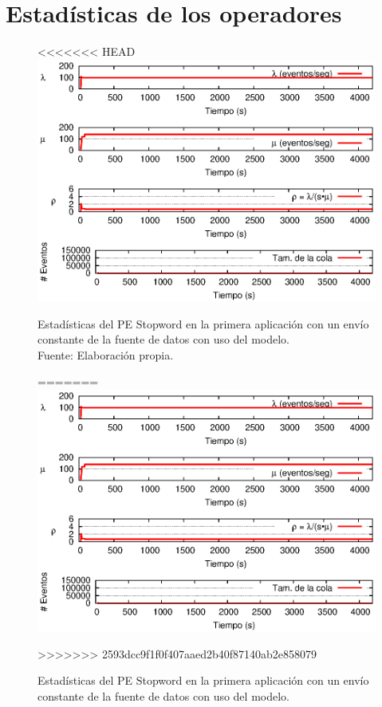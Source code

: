 \chapter{Estad\'isticas de los operadores}
\label{apendice:estadisticas-operadores}
\begin{figure}[!ht]
<<<<<<< HEAD
    \centering
    \captionsetup{justification=centering}
    \includegraphics[scale=0.9]{images/exp/app1/uniform/cm/statusStopwordPE.eps}
    \caption[Estadísticas del PE Stopword en la primera aplicación con un envío constante de la fuente de datos con uso del modelo.]{Estadísticas del PE Stopword en la primera aplicación con un envío constante de la fuente de datos con uso del modelo.\\Fuente: Elaboración propia.}
=======
\centering
    \includegraphics[scale=1]{images/exp/app1/uniform/cm/statusStopwordPE.eps}
    \caption{Estad\'isticas del PE Stopword en la primera aplicaci\'on con un env\'io constante de la fuente de datos con uso del modelo.}
>>>>>>> 2593dcc9f1f0f407aaed2b40f87140ab2e858079
    \label{fig:app1-uniform-statusStopwordPE-cm}
\end{figure}

